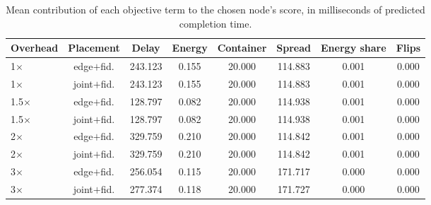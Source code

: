 \begin{table}
\centering
\scriptsize
\caption{Mean contribution of each objective term to the chosen node's score, in milliseconds of predicted completion time.}
\label{tab:p2-objective}
\begin{tabular}{lccccccc}
\toprule
Overhead & Placement & Delay & Energy & Container & Spread & Energy share & Flips \\
\midrule
1$\times$ & edge$+$fid. & 243.123 & 0.155 & 20.000 & 114.883 & 0.001 & 0.000 \\
1$\times$ & joint$+$fid. & 243.123 & 0.155 & 20.000 & 114.883 & 0.001 & 0.000 \\
1.5$\times$ & edge$+$fid. & 128.797 & 0.082 & 20.000 & 114.938 & 0.001 & 0.000 \\
1.5$\times$ & joint$+$fid. & 128.797 & 0.082 & 20.000 & 114.938 & 0.001 & 0.000 \\
2$\times$ & edge$+$fid. & 329.759 & 0.210 & 20.000 & 114.842 & 0.001 & 0.000 \\
2$\times$ & joint$+$fid. & 329.759 & 0.210 & 20.000 & 114.842 & 0.001 & 0.000 \\
3$\times$ & edge$+$fid. & 256.054 & 0.115 & 20.000 & 171.717 & 0.000 & 0.000 \\
3$\times$ & joint$+$fid. & 277.374 & 0.118 & 20.000 & 171.727 & 0.000 & 0.000 \\
\bottomrule
\end{tabular}
\par\vspace{2pt}{\footnotesize\raggedright A term that never exceeds the spread of the score cannot change a decision; the flip column counts the decisions the whole objective changed relative to the delay-only rule.\par}
\end{table}
